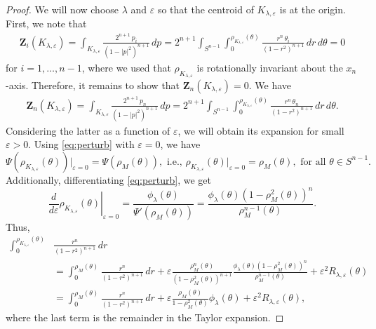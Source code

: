 \documentclass[12pt,letterpaper,reqno]{amsart}
\theoremstyle{definition}
\begin{document}
\begin{proof}
	
	We will now choose $\lambda$ and $\varepsilon$ so that the centroid of $K_{\lambda,\varepsilon}$ is at the origin. 
First, we note that
\begin{align*}
	\bm{Z}_i(K_{\lambda,\varepsilon})  = \int_{K_{\lambda,\varepsilon}}\frac{2^{n+1}\,p_i}{(1-|p|^2)^{n+1}}\,dp = 2^{n+1} \int_{S^{n-1}}\int_0^{\rho_{K_{\lambda,\varepsilon}}(\theta)}   \frac{r^n\, \theta_i}{(1-r^2)^{n+1}}\,dr\, d\theta =0
\end{align*}
for $i = 1, \dots, n-1$, where we used that $\rho_{K_{\lambda,\varepsilon}}$ is rotationally invariant about the $x_n$-axis. Therefore, it remains to show that $\bm{Z}_n(K_{\lambda,\varepsilon}) = 0$. We have	
\begin{align*}	\bm{Z}_n(K_{\lambda,\varepsilon})  = \int_{K_{\lambda,\varepsilon}}\frac{2^{n+1}\,p_n}{(1-|p|^2)^{n+1}}\,dp  = 2^{n+1} \int_{S^{n-1}}\int_0^{\rho_{K_{\lambda,\varepsilon}}(\theta)}   \frac{r^n\, \theta_n}{(1-r^2)^{n+1}}\,dr\, d\theta.
	\end{align*}	
Considering the latter as a function of  $\varepsilon$, we will obtain  its expansion for small $\varepsilon>0$.
	Using  \eqref{eq:perturb} with $\varepsilon =0$, we have  
	$$	\Psi(\rho_{K_{\lambda,\varepsilon}}(\theta))\left.\right|_{\varepsilon=0}
	= \Psi(\rho_M(\theta)),   \mbox{ i.e., }   \rho_{K_{\lambda,\varepsilon}}(\theta)\left.\right|_{\varepsilon=0}=\rho_M(\theta), \mbox{ for all } \theta\in S^{n-1}.$$
	Additionally, differentiating \eqref{eq:perturb}, we get
$$\left.\frac{d}{d\varepsilon}	\rho_{K_{\lambda,\varepsilon}}(\theta) \right|_{\varepsilon=0}=\frac{\phi_{\lambda}(\theta)}{\Psi'(\rho_M(\theta))}=\frac{\phi_{\lambda}(\theta)(1-\rho_M^2(\theta))^n}{ \rho_M^{n-1}(\theta)}.$$
Thus,
\begin{align*} \int_0^{\rho_{K_{\lambda,\varepsilon}}(\theta)}&  \frac{ r^n  }{(1-r^2)^{n+1}}\,dr \\
	& = \int_0^{\rho_M(\theta)}   \frac{ r^n  }{(1-r^2)^{n+1}}\,dr + \varepsilon     \frac{ \rho_M^n(\theta) }{(1-\rho_M^2(\theta))^{n+1}}
\frac{\phi_{\lambda}(\theta)(1-\rho_M^2(\theta))^n}{ \rho_M^{n-1}(\theta)} +\varepsilon^2 R_{\lambda,\varepsilon} (\theta)\\
&= \int_0^{\rho_M(\theta)}   \frac{ r^n  }{(1-r^2)^{n+1}}\,dr + \varepsilon     \frac{ \rho_M(\theta) }{1-\rho_M^2(\theta)}
 \phi_{\lambda}(\theta) +\varepsilon^2 R_{\lambda,\varepsilon} (\theta),
 \end{align*}
 where the last term is the remainder in the Taylor expansion.


\end{proof}
\end{document}
